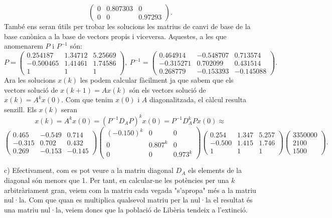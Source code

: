 \documentclass[11pt]{article}
\begin{document}
\begin{legal}
\begin{legal}
$$\begin{pmatrix}
	0 & 0.807303 & 0\\
	0 & 0 & 0.97293
	\end{pmatrix}.
	$$
	També ens seran útils per trobar les solucions les matrius de canvi de base de la base canònica a la base de vectors propis i viceversa. Aquestes, a les que anomenarem $P$ i $P^{-1}$ són:
	$$
	P=\begin{pmatrix}
	0.254187 & 1.34712 & 5.25669\\
	-0.500465 & 1.41461 & 1.74586\\
	1 & 1 & 1
	\end{pmatrix},\ 
	P^{-1}=\begin{pmatrix}
	0.464914 & -0.548707 & 0.713574\\
	-0.315271 & 0.702099 & 0.431514\\
	0.268779 & -0.153393 & -0.145088
	\end{pmatrix}.
	$$
	Ara les solucions $x(k)$ les podem calcular fàcilment ja que sabem que els vectors solució de $x(k+1)=Ax(k)$ són els vectors solució de $x(k)=A^kx(0)$. Com que tenim $x(0)$ i $A$ diagonalitzada, el càlcul resulta senzill. Els $x(k)$ seran
	$$
	x(k)=A^kx(0)=(P^{-1}D_AP)^kx(0)=P^{-1}D_A^kPx(0)\approx$$
	$$
	\begin{pmatrix}
	0.465 & -0.549 & 0.714\\
	-0.315 & 0.702 & 0.432\\
	0.269 & -0.153 & -0.145
	\end{pmatrix}\begin{pmatrix}
	(-0.150)^k & 0 & 0\\
	0 & 0.807^k & 0\\
	0 & 0 & 0.973^k
	\end{pmatrix}\begin{pmatrix}
	0.254 & 1.347 & 5.257\\
	-0.500 & 1.415 & 1.746\\
	1 & 1 & 1
	\end{pmatrix}\begin{pmatrix}3350000\\ 2100\\ 1500\end{pmatrix}
	.
	$$
	\item[c)] Efectivament, com es pot veure a la matriu diagonal $D_A$ els elements de la diagonal són menors que 1. Per tant, en calcular-ne les potències per una $k$ arbitràriament gran, veiem com la matriu cada vegada "s'apropa" més a la matriu nul·la. Com que quan es multiplica qualsevol matriu per la nul·la el resultat és una matriu nul·la, veiem doncs que la població de Libèria tendeix a l'extinció.

\end{legal}
\end{legal}
\end{document}
